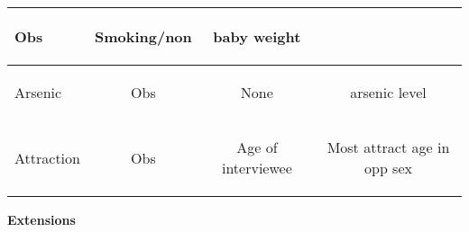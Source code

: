 \begin{enumerate}
\begin{tabular}{|l|c|c|c|}
\begin{key}
  Obs
\end{key}
&
\begin{key}
  Smoking/non
\end{key}
&
\begin{key}
  baby weight 
\end{key}
\\ \hline
Arsenic &
\begin{key}
  Obs
\end{key}
&
\begin{key}
 None
\end{key}
&
\begin{key}
  arsenic level 
\end{key}
\\ \hline
Attraction &
\begin{key}
  Obs
\end{key}
&
\begin{key}
 Age of interviewee
\end{key}
&
\begin{key}
 Most attract age in opp sex
\end{key}
\\ \hline
 \end{tabular}


 \begin{center}
{\bf Extensions }   
 \end{center}




\end{enumerate}
